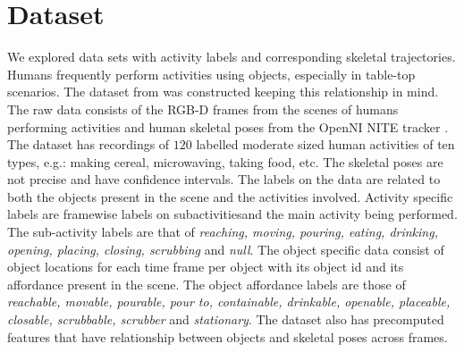 \documentclass{article} %
\begin{document}
\section{Dataset}
We explored data sets with activity labels and corresponding skeletal trajectories. Humans frequently perform activities using objects, especially in table-top scenarios. The dataset from \cite{koppula2013detectingactivitiesrgbd} was constructed keeping this relationship in mind. The raw data consists of the RGB-D frames from the scenes of humans performing activities and human skeletal poses from the OpenNI NITE tracker \cite{PrimeSense2010}. The dataset has recordings of  $120$ labelled moderate sized human activities of ten types, e.g.: making cereal, microwaving, taking food, etc. The skeletal poses are not precise and have confidence intervals. The labels on the data are related to both the objects present in the scene and the activities involved. Activity specific labels are framewise labels on subactivitiesand the main activity being performed. The sub-activity labels are that of \textit{reaching, moving, pouring, eating, drinking, opening, placing, closing, scrubbing} and \textit{null}. The object specific data consist of object locations for each time frame per object with its object id and its affordance present in the scene. The object affordance labels are those of \textit{reachable, movable, pourable, pour to, containable, drinkable, openable, placeable, closable, scrubbable, scrubber} and \textit{stationary}. The dataset also has precomputed features that have relationship between objects and skeletal poses across frames.  
\end{document}
